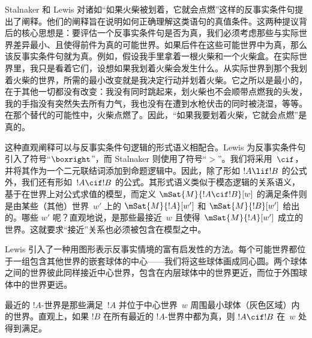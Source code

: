 \documentclass[../../../include/open-logic-section]{subfiles}
\begin{document}


Stalnaker 和 Lewis 对诸如“如果火柴被划着，它就会点燃”这样的反事实条件句提出了阐释。他们的阐释旨在说明如何正确理解这类语句的真值条件。这两种提议背后的核心思想是：要评估一个反事实条件句是否为真，我们必须考虑那些与实际世界差异最小、且使得前件为真的可能世界。如果后件在这些可能世界中为真，那么该反事实条件句就为真。例如，假设我手里拿着一根火柴和一个火柴盒。在实际世界里，我只是看着它们，设想如果我划着火柴会发生什么。从实际世界到那个我划着火柴的世界，所需的最小改变就是我决定行动并划着火柴。它之所以是最小的，在于其他一切都没有改变：我没有同时跳起来，划火柴也不会顺带点燃我的头发，我的手指没有突然失去所有力气，我也没有在遭到水枪伏击的同时被浇湿，等等。在那个替代的可能性中，火柴点燃了。因此，“如果我要划着火柴，它就会点燃”是真的。

这种直观阐释可以与反事实条件句逻辑的形式语义相配合。Lewis 为反事实条件句引入了符号“$\boxright$”，而 Stalnaker 则使用了符号“$>$”。我们将采用~$\cif$，并将其作为一个二元联结词添加到命题逻辑中。因此，除了形如 $!A \lif !B$ 的公式外，我们还有形如~$!A \cif !B$ 的公式。其形式语义类似于模态逻辑的关系语义，基于在世界上对公式求值的模型，而定义 $\mSat{M}{!A \cif !B}[w]$ 的满足条件则是由某些（其他）世界~$w'$ 上的 $\mSat{M}{!A}[w']$ 和 $\mSat{M}{!B}[w']$ 给出的。哪些 $w'$ 呢？直观地说，是那些最接近~$w$ 且使得~$\mSat{M}{!A}[w']$ 成立的世界。这就要求“接近”关系也必须被包含在模型之中。

Lewis 引入了一种用图形表示反事实情境的富有启发性的方法。每个可能世界都位于一组包含其他世界的嵌套球体的中心——我们将这些球体画成同心圆。两个球体之间的世界彼此同样接近中心世界，包含在内层球体中的世界更近，而位于外围球体中的世界更远。

\begin{center}
\end{center}

最近的 $!A$-世界是那些满足~$!A$ 并位于中心世界~$w$ 周围最小球体（灰色区域）内的世界。直观上，如果 $!B$ 在所有最近的 $!A$-世界中都为真，则 $!A \cif !B$ 在~$w$ 处得到满足。
\end{document}
